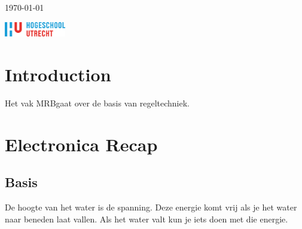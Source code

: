 \documentclass[fleqn]{article}
\newcommand\class{MRB}
\begin{document}
\begin{titlepage}
{	\vfill\vfill\vfill %
	
	{\large\monthyeardate\today}%
	
	
	\vfill
	\vfill
	 \includegraphics[width=0.2\textwidth]{../images/hu.png}
	
     }
\end{titlepage}

\tableofcontents

\chapter{Introduction}
Het vak \class gaat over de basis van regeltechniek.  

\chapter{Electronica Recap}
\section{Basis}
De hoogte van het water is de spanning. Deze energie komt vrij als je het water naar beneden laat vallen. Als het water
valt kun je iets doen met die energie. 
\end{document}
